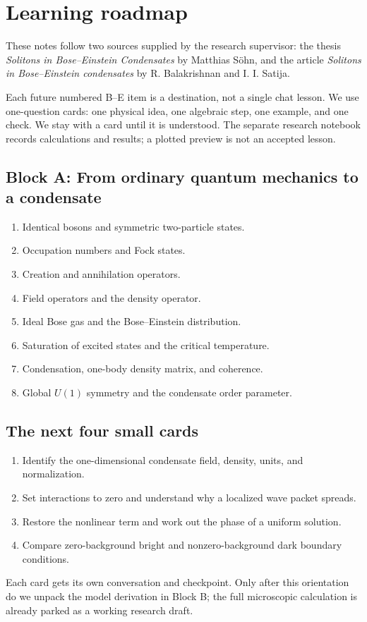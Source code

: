 \section{Learning roadmap}

These notes follow two sources supplied by the research supervisor:
the thesis \emph{Solitons in Bose--Einstein Condensates} by Matthias S\"ohn,
and the article \emph{Solitons in Bose--Einstein condensates} by
R. Balakrishnan and I. I. Satija.

Each future numbered B--E item is a destination, not a single chat lesson. We use one-question cards: one physical idea, one algebraic step, one example, and one check. We stay with a card until it is understood. The separate research notebook records calculations and results; a plotted preview is not an accepted lesson.

\subsection{Block A: From ordinary quantum mechanics to a condensate}
\begin{enumerate}[label=A\arabic*.]
  \item Identical bosons and symmetric two-particle states.
  \item Occupation numbers and Fock states.
  \item Creation and annihilation operators.
  \item Field operators and the density operator.
  \item Ideal Bose gas and the Bose--Einstein distribution.
  \item Saturation of excited states and the critical temperature.
  \item Condensation, one-body density matrix, and coherence.
  \item Global $U(1)$ symmetry and the condensate order parameter.
\end{enumerate}

\subsection{The next four small cards}
\begin{enumerate}[label=0.\arabic*.]
  \item Identify the one-dimensional condensate field, density, units, and normalization.
  \item Set interactions to zero and understand why a localized wave packet spreads.
  \item Restore the nonlinear term and work out the phase of a uniform solution.
  \item Compare zero-background bright and nonzero-background dark boundary conditions.
\end{enumerate}
Each card gets its own conversation and checkpoint. Only after this orientation do we unpack the model derivation in Block B; the full microscopic calculation is already parked as a working research draft.


